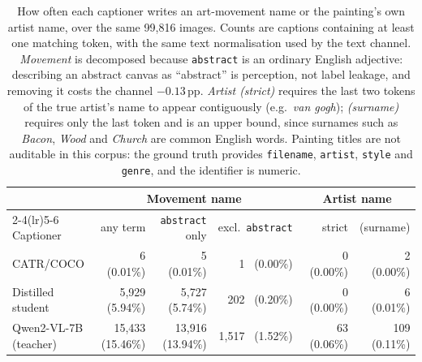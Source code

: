 \begin{table}[t]
\centering
\caption{How often each captioner writes an art-movement name or the
painting's own artist name, over the same 99{,}816 images. Counts are
captions containing at least one matching token, with the same text
normalisation used by the text channel. \emph{Movement} is decomposed because
\texttt{abstract} is an ordinary English adjective: describing an abstract
canvas as ``abstract'' is perception, not label leakage, and removing it costs
the channel $-0.13$\,pp. \emph{Artist (strict)} requires the last two tokens of
the true artist's name to appear contiguously (e.g.\ \emph{van gogh});
\emph{(surname)} requires only the last token and is an upper bound, since
surnames such as \emph{Bacon}, \emph{Wood} and \emph{Church} are common English
words. Painting titles are not auditable in this corpus: the ground truth
provides \texttt{filename}, \texttt{artist}, \texttt{style} and \texttt{genre},
and the identifier is numeric.}
\label{tab:captioner-leakage}
\begin{tabular}{lrrrrr}
\toprule
& \multicolumn{3}{c}{Movement name} & \multicolumn{2}{c}{Artist name} \\
\cmidrule(lr){2-4}\cmidrule(lr){5-6}
Captioner & any term & \texttt{abstract} only & excl.\ \texttt{abstract}
          & strict & (surname) \\
\midrule
CATR/COCO            &      6 \ (0.01\%) &      5 \ (0.01\%) &     1 \ (0.00\%) &  0 \ (0.00\%) &   2 \ (0.00\%) \\
Distilled student    &  5{,}929 \ (5.94\%) &  5{,}727 \ (5.74\%) &   202 \ (0.20\%) &  0 \ (0.00\%) &   6 \ (0.01\%) \\
Qwen2-VL-7B (teacher)& 15{,}433 \ (15.46\%) & 13{,}916 \ (13.94\%) & 1{,}517 \ (1.52\%) & 63 \ (0.06\%) & 109 \ (0.11\%) \\
\bottomrule
\end{tabular}
\end{table}
